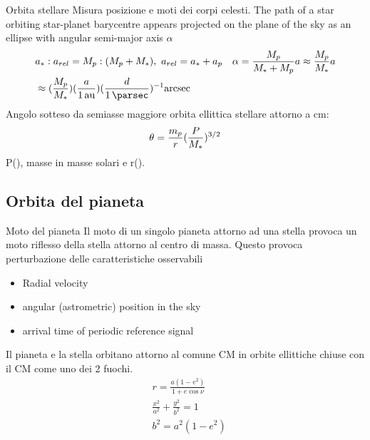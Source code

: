 \begin{wordonframe}{Orbita stellare}
Misura posizione e moti dei corpi celesti. The path of a star orbiting star-planet barycentre appears projected on the plane of the sky as an ellipse with angular semi-major axis $\alpha$
\begin{align*}
&a_*:a_{rel}=M_p:(M_p+M_*),\ a_{rel}=a_*+a_p
&\alpha=\frac{M_p}{M_*+M_p}a\approx\frac{M_p}{M_*}a\\
&\approx(\frac{M_p}{M_*})(\frac{a}{\SI{1}{\astronomicalunit}})(\frac{d}{\SI{1}{\parsec}})\expy{-1}\si{\arcsec}
\end{align*}
Angolo sotteso da semiasse maggiore orbita ellittica stellare attorno a cm:
\begin{equation*}
\theta=\frac{m_p}{r}(\frac{P}{M_*})^{3/2}
\end{equation*}
P(\si{\year}), masse in masse solari e r(\si{\parsec}).
\end{wordonframe}

\subsection{Orbita del pianeta}

\begin{frame}{Moto del pianeta}
Il moto di un singolo pianeta attorno ad una stella provoca un moto riflesso della stella attorno al centro di massa. Questo provoca perturbazione delle caratteristiche osservabili
\begin{itemize}
    \item Radial velocity
    \item angular (astrometric) position in the sky
    \item arrival time of periodic reference signal 
\end{itemize}
Il pianeta e la stella orbitano attorno al comune CM in orbite ellittiche chiuse con il CM come uno dei 2 fuochi.
\begin{align*}
&r=\frac{a(1-e^2)}{1+e\cos{\nu}}\\
&\frac{x^2}{a^2}+\frac{y^2}{b^2}=1\\
&b^2=a^2(1-e^2)
\end{align*}
\end{frame}


